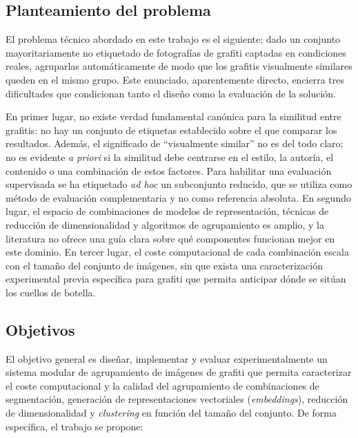 \subsection{Planteamiento del problema}
\label{subsec:intro-problema}

El problema técnico abordado en este trabajo es el siguiente: dado un conjunto
mayoritariamente no etiquetado de fotografías de grafiti captadas en
condiciones reales, agruparlas automáticamente de modo que los grafitis
visualmente similares queden en el mismo grupo. Este enunciado, aparentemente
directo, encierra tres dificultades que condicionan tanto el diseño como la
evaluación de la solución.

En primer lugar, no existe verdad fundamental canónica para la similitud entre
grafitis: no hay un conjunto de etiquetas establecido sobre el que comparar los
resultados. Además, el significado de \enquote{visualmente similar} no es del
todo claro; no es evidente \textit{a priori} si la similitud debe centrarse en
el estilo, la autoría, el contenido o una combinación de estos factores. Para
habilitar una evaluación supervisada se ha etiquetado \textit{ad hoc} un
subconjunto reducido, que se utiliza como método de evaluación complementaria y
no como referencia absoluta. En segundo lugar, el espacio de combinaciones de
modelos de representación, técnicas de reducción de dimensionalidad y
algoritmos de agrupamiento es amplio, y la literatura no ofrece una guía clara
sobre qué componentes funcionan mejor en este dominio. En tercer lugar, el
coste computacional de cada combinación escala con el tamaño del conjunto de
imágenes, sin que exista una caracterización experimental previa específica
para grafiti que permita anticipar dónde se sitúan los cuellos de botella.

\subsection{Objetivos}
\label{subsec:intro-objetivos}

El objetivo general es diseñar, implementar y evaluar experimentalmente un
sistema modular de agrupamiento de imágenes de grafiti que permita caracterizar
el coste computacional y la calidad del agrupamiento de combinaciones de
segmentación, generación de representaciones vectoriales (\textit{embeddings}),
reducción de dimensionalidad y \textit{clustering} en función del tamaño del
conjunto. De forma específica, el trabajo se propone:

